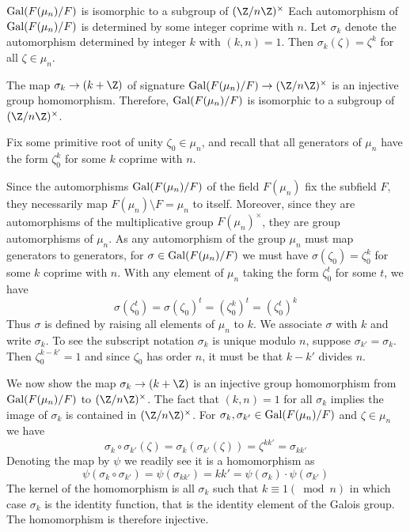 \begin{theorem}{$\text{Gal}(F(\mu_n)/F)$ is isomorphic to a subgroup of $(\Z/n\Z)^\times$}
    Each automorphism of $\text{Gal}(F(\mu_n)/F)$ is determined by some integer coprime with $n$.
    Let $\sigma_k$ denote the automorphism determined by integer $k$ with $(k,n)=1$.
    Then $\sigma_k(\zeta)=\zeta^k$ for all $\zeta\in\mu_n$.

    The map $\sigma_k\to(k+\Z)$ of signature $\Gal(F(\mu_n)/F)\to(\Z/n\Z)^\times$ is an injective group homomorphism.
    Therefore, $\text{Gal}(F(\mu_n)/F)$ is isomorphic to a subgroup of $(\Z/n\Z)^\times$.

    \proof
    Fix some primitive root of unity $\zeta_0\in\mu_n$, and recall that all generators of $\mu_n$ have the form $\zeta_0^k$ for some $k$ coprime with $n$.

    Since the automorphisms $\text{Gal}(F(\mu_n)/F)$ of the field $F(\mu_n)$ fix the subfield $F$, they necessarily map $F(\mu_n)\setminus F = \mu_n$ to itself.
    Moreover, since they are automorphisms of the multiplicative group $F(\mu_n)^\times$, they are group automorphisms of $\mu_n$.
    As any automorphism of the group $\mu_n$ must map generators to generators, for $\sigma\in\text{Gal}(F(\mu_n)/F)$ we must have $\sigma(\zeta_0)=\zeta_0^k$ for some $k$ coprime with $n$.
    With any element of $\mu_n$ taking the form $\zeta_0^t$ for some $t$, we have
    \begin{equation}
        \sigma(\zeta_0^t) = \sigma(\zeta_0)^t = (\zeta_0^k)^t = (\zeta_0^t)^k
    \end{equation}
    Thus $\sigma$ is defined by raising all elements of $\mu_n$ to $k$.
    We associate $\sigma$ with $k$ and write $\sigma_k$.
    To see the subscript notation $\sigma_k$ is unique modulo $n$, suppose $\sigma_{k'}=\sigma_k$.
    Then $\zeta_0^{k-k'}=1$ and since $\zeta_0$ has order $n$, it must be that $k-k'$ divides $n$.

    We now show the map $\sigma_k\to(k+\Z)$ is an injective group homomorphism from $\text{Gal}(F(\mu_n)/F)$ to $(\Z/n\Z)^\times$.
    The fact that $(k,n)=1$ for all $\sigma_k$ implies the image of $\sigma_k$ is contained in $(\Z/n\Z)^\times$.
    For $\sigma_k,\sigma_{k'}\in\text{Gal}(F(\mu_n)/F)$ and $\zeta\in\mu_n$ we have 
    \begin{equation}
        \sigma_k\circ\sigma_{k'}(\zeta) = \sigma_k(\sigma_{k'}(\zeta))
        = \zeta^{kk'} = \sigma_{kk'}
    \end{equation}
    Denoting the map by $\psi$ we readily see it is a homomorphism as
    \begin{equation}
        \psi(\sigma_k\circ\sigma_{k'}) = \psi(\sigma_{kk'}) = kk' = \psi(\sigma_k)\cdot\psi(\sigma_{k'})
    \end{equation}
    The kernel of the homomorphism is all $\sigma_k$ such that $k\equiv1(\bmod n)$ in which case $\sigma_k$ is the identity function, that is the identity element of the Galois group.
    The homomorphism is therefore injective.
\end{theorem}

